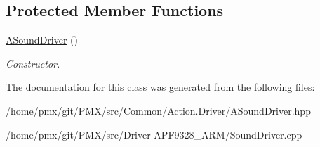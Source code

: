 \subsection*{Protected Member Functions}
\begin{DoxyCompactItemize}
\item 
\mbox{\label{classASoundDriver_a8feb8c4ad2739e174b239225eb625d53}} 
\hyperlink{classASoundDriver_a8feb8c4ad2739e174b239225eb625d53}{A\+Sound\+Driver} ()
\begin{DoxyCompactList}\small\item\em Constructor. \end{DoxyCompactList}\end{DoxyCompactItemize}


The documentation for this class was generated from the following files\+:\begin{DoxyCompactItemize}
\item 
/home/pmx/git/\+P\+M\+X/src/\+Common/\+Action.\+Driver/A\+Sound\+Driver.\+hpp\item 
/home/pmx/git/\+P\+M\+X/src/\+Driver-\/\+A\+P\+F9328\+\_\+\+A\+R\+M/Sound\+Driver.\+cpp\end{DoxyCompactItemize}

